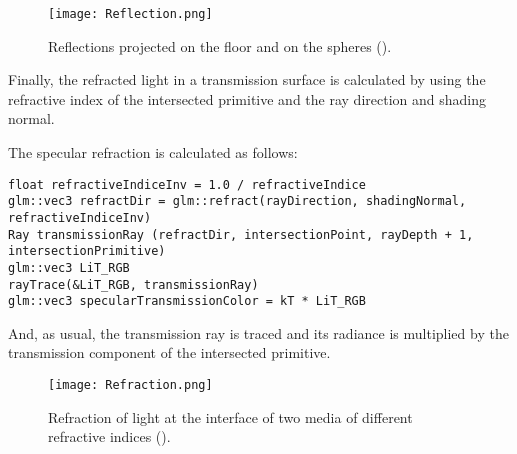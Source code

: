 \begin{figure}[H]
	\centering
	\caption{Reflections projected on the floor and on the spheres (\cite{RTReflections}).}
	\label{Reflection.}
	\texttt{[image: Reflection.png]}
\end{figure}

\par
Finally, the refracted light in a transmission surface is calculated by using the refractive index of the intersected primitive and the ray direction and shading normal.

The specular refraction is calculated as follows:

\begin{lstlisting}[caption={Algorithm of Specular Transmission}, captionpos=b, label=Transmission]
float refractiveIndiceInv = 1.0 / refractiveIndice
glm::vec3 refractDir = glm::refract(rayDirection, shadingNormal, refractiveIndiceInv)
Ray transmissionRay (refractDir, intersectionPoint, rayDepth + 1, intersectionPrimitive)
glm::vec3 LiT_RGB
rayTrace(&LiT_RGB, transmissionRay)
glm::vec3 specularTransmissionColor = kT * LiT_RGB
\end{lstlisting}

\iffalse
First, the shading normal is inverted if the origin of the ray was inside a primitive, like a sphere, and if it was not then the refractive index is inverted.
Then, it is calculated two auxiliary scalar projections:
$cosTheta1$
and
$cosTheta2$
.
$cosTheta1$
is the dot product of the inverse of the shading normal and the ray direction, and
$cosTheta2$
is the difference of one and refractive index squared multiplied by one minus
$cosTheta1$
squared.
Then, if
$cosTheta2$
is greater than zero, then the direction of the transmission ray is ray direction multiplied with refractive index plus shading normal multiplied by refractive index multiplied $cosTheta1$
minus square root of 
$cosTheta2$
.
Else, the direction of the transmission ray is just ray direction plus shading normal multiplied by the double of
$cosTheta1$
.
\fi

And, as usual, the transmission ray is traced and its radiance is multiplied by the transmission component of the intersected primitive.

\begin{figure}[H]
	\centering
	\caption{Refraction of light at the interface of two media of different refractive indices (\cite{RTRefractions}).}
	\label{Refraction.}
	\texttt{[image: Refraction.png]}
\end{figure}

